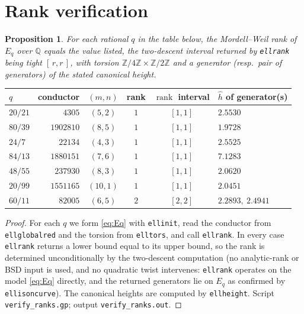 \documentclass[11pt,reqno]{amsart}
\theoremstyle{plain}
\newtheorem{proposition}[theorem]{Proposition}
\theoremstyle{definition}
\newcommand{\Q}{\mathbb{Q}}
\newcommand{\Z}{\mathbb{Z}}
\newcommand{\hath}{\hat{h}}
\DeclareMathOperator{\rank}{rank}
\begin{document}
\section{Rank verification}

\begin{proposition}\label{prop:ranks}
For each rational $q$ in the table below, the Mordell--Weil rank of $E_q$ over
$\Q$ equals the value listed, the two-descent interval returned by
\textup{\texttt{ellrank}} being tight $[\,r,r\,]$, with torsion
$\Z/4\Z\times\Z/2\Z$ and a generator (resp.\ pair of generators) of the stated
canonical height.
\end{proposition}

\begin{center}
\begin{tabular}{lrcccl}
\hline
$q$ & conductor & $(m,n)$ & rank & $\rank$ interval & $\hath$ of generator(s)\\
\hline
$20/21$ & $4305$    & $(5,2)$  & $1$ & $[1,1]$ & $2.5530$\\
$80/39$ & $1902810$ & $(8,5)$  & $1$ & $[1,1]$ & $1.9728$\\
$24/7$  & $22134$   & $(4,3)$  & $1$ & $[1,1]$ & $2.5525$\\
$84/13$ & $1880151$ & $(7,6)$  & $1$ & $[1,1]$ & $7.1283$\\
$48/55$ & $237930$  & $(8,3)$  & $1$ & $[1,1]$ & $2.0620$\\
$20/99$ & $1551165$ & $(10,1)$ & $1$ & $[1,1]$ & $2.0451$\\
$60/11$ & $82005$   & $(6,5)$  & $2$ & $[2,2]$ & $2.2893,\ 2.4941$\\
\hline
\end{tabular}
\end{center}

\begin{proof}
For each $q$ we form \eqref{eq:Eq} with \texttt{ellinit}, read the conductor
from \texttt{ellglobalred} and the torsion from \texttt{elltors}, and call
\texttt{ellrank}. In every case \texttt{ellrank} returns a lower bound equal to
its upper bound, so the rank is determined unconditionally by the two-descent
computation (no analytic-rank or BSD input is used, and no quadratic twist
intervenes: \texttt{ellrank} operates on the model \eqref{eq:Eq} directly, and
the returned generators lie on $E_q$ as confirmed by \texttt{ellisoncurve}).
The canonical heights are computed by \texttt{ellheight}. Script
\texttt{verify\_ranks.gp}; output \texttt{verify\_ranks.out}.
\end{proof}
\end{document}

